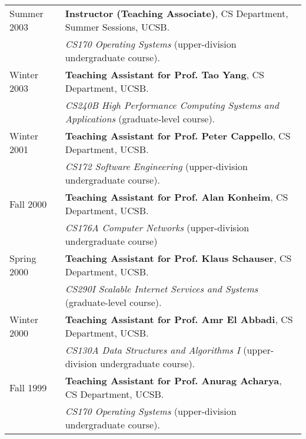 \documentclass[10pt]{article}
\begin{document}
\begin{tabular}{ll}
{ Summer 2003} & 
 {\bf Instructor (Teaching Associate)}, CS Department, Summer Sessions, UCSB.\\
 & {\em CS170 Operating Systems} (upper-division undergraduate course).\\

{ Winter 2003} & 
 {\bf Teaching Assistant for Prof. Tao Yang}, CS Department, UCSB. \\
 & {\em CS240B High Performance Computing Systems and Applications} (graduate-level course).\\

{ Winter 2001} & 
 {\bf Teaching Assistant for Prof. Peter Cappello}, CS Department, UCSB. \\
 & {\em CS172 Software Engineering} (upper-division undergraduate course).\\

{ Fall 2000} & 
 {\bf Teaching Assistant for Prof. Alan Konheim}, CS Department, UCSB. \\
 & {\em CS176A Computer Networks} (upper-division undergraduate course) \\

{ Spring 2000} & 
 {\bf Teaching Assistant for Prof. Klaus Schauser}, CS Department, UCSB. \\
 & {\em CS290I Scalable Internet Services and Systems} (graduate-level course).\\

{ Winter 2000} & 
 {\bf Teaching Assistant for Prof. Amr El Abbadi}, CS Department, UCSB. \\
 & {\em CS130A Data Structures and Algorithms I} (upper-division undergraduate course).\\

{ Fall 1999}   & 
 {\bf Teaching Assistant for Prof. Anurag Acharya}, CS Department, UCSB. \\
 & {\em CS170 Operating Systems} (upper-division undergraduate course).\\
\end{tabular}



\end{document}
